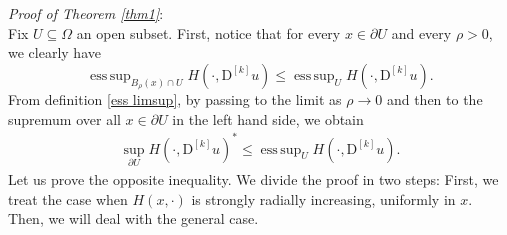 \documentclass[a4paper,11pt]{article}
\numberwithin{equation}{section}
\newcommand{\Om}{\Omega}
\DeclareMathOperator*{\esssup}{ess\,sup}
\theoremstyle{definition}
\begin{document}
\textit{Proof of Theorem \ref{thm1}}:\\
Fix $U\subseteq\Om$ an open subset. First, notice that for every $x\in\partial U$ and every $\rho>0$, we clearly have
$$
\esssup_{B_\rho(x)\cap U}H(\cdot,\mathrm D^{[k]}u)\leq \esssup_{ U}H(\cdot,\mathrm D^{[k]}u).
$$ 
From definition \ref{ess limsup}, by passing to the limit as $\rho\to0$ and then to the supremum over all $x\in\partial U$ in the left hand side, we obtain
\begin{align}\label{one ineq}
\sup_{\partial U}H(\cdot,\mathrm D ^{[k]}u)^*\leq\esssup_U H(\cdot, \mathrm D ^{[k]}u).
\end{align}
Let us prove the opposite inequality. We divide the proof in two steps: First, we treat the case when $H(x,\cdot)$ is strongly radially increasing, uniformly in $x$. Then, we will deal with the general case.\\
\end{document}
